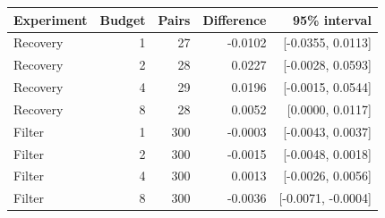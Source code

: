\begin{tabular}{lrrrr}
\toprule
Experiment & Budget & Pairs & Difference & 95\% interval \\
\midrule
Recovery & 1 & 27 & -0.0102 & [-0.0355, 0.0113] \\
Recovery & 2 & 28 & 0.0227 & [-0.0028, 0.0593] \\
Recovery & 4 & 29 & 0.0196 & [-0.0015, 0.0544] \\
Recovery & 8 & 28 & 0.0052 & [0.0000, 0.0117] \\
Filter & 1 & 300 & -0.0003 & [-0.0043, 0.0037] \\
Filter & 2 & 300 & -0.0015 & [-0.0048, 0.0018] \\
Filter & 4 & 300 & 0.0013 & [-0.0026, 0.0056] \\
Filter & 8 & 300 & -0.0036 & [-0.0071, -0.0004] \\
\bottomrule
\end{tabular}
